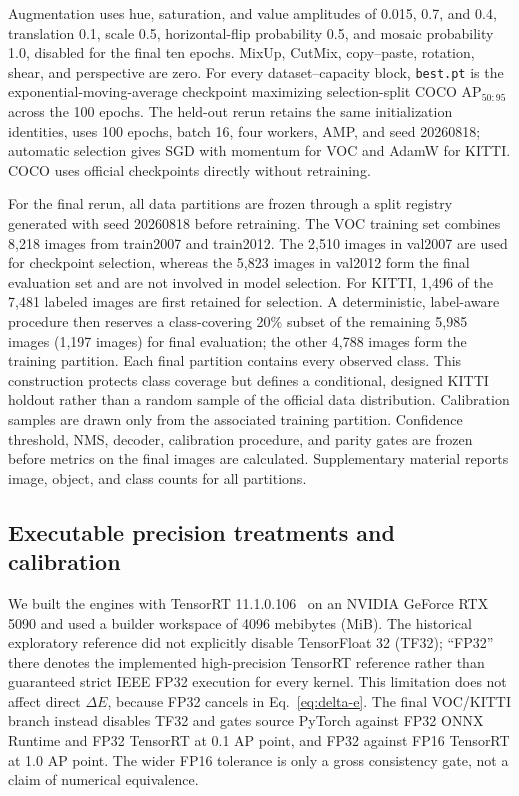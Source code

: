 \documentclass[a4paper,fleqn]{cas-dc}
\begin{document}
Augmentation uses hue, saturation, and value amplitudes of 0.015, 0.7, and 0.4, translation 0.1, scale 0.5, horizontal-flip probability 0.5, and mosaic probability 1.0, disabled for the final ten epochs. MixUp, CutMix, copy--paste, rotation, shear, and perspective are zero. For every dataset--capacity block, \texttt{best.pt} is the exponential-moving-average checkpoint maximizing selection-split COCO AP$_{50:95}$ across the 100 epochs. The held-out rerun retains the same initialization identities, uses 100 epochs, batch 16, four workers, AMP, and seed 20260818; automatic selection gives SGD with momentum for VOC and AdamW for KITTI. COCO uses official checkpoints directly without retraining.

For the final rerun, all data partitions are frozen through a split registry generated with seed 20260818 before retraining. The VOC training set combines 8,218 images from train2007 and train2012. The 2,510 images in val2007 are used for checkpoint selection, whereas the 5,823 images in val2012 form the final evaluation set and are not involved in model selection. For KITTI, 1,496 of the 7,481 labeled images are first retained for selection. A deterministic, label-aware procedure then reserves a class-covering 20\% subset of the remaining 5,985 images (1,197 images) for final evaluation; the other 4,788 images form the training partition. Each final partition contains every observed class. This construction protects class coverage but defines a conditional, designed KITTI holdout rather than a random sample of the official data distribution. Calibration samples are drawn only from the associated training partition. Confidence threshold, NMS, decoder, calibration procedure, and parity gates are frozen before metrics on the final images are calculated. Supplementary material reports image, object, and class counts for all partitions.

\subsection{Executable precision treatments and calibration}
\label{sec:precision-treatments}

We built the engines with TensorRT 11.1.0.106~\citep{nvidia2026tensorrt} on an NVIDIA GeForce RTX 5090 and used a builder workspace of 4096 mebibytes (MiB). The historical exploratory reference did not explicitly disable TensorFloat 32 (TF32); ``FP32'' there denotes the implemented high-precision TensorRT reference rather than guaranteed strict IEEE FP32 execution for every kernel. This limitation does not affect direct $\Delta E$, because FP32 cancels in Eq.~\eqref{eq:delta-e}. The final VOC/KITTI branch instead disables TF32 and gates source PyTorch against FP32 ONNX Runtime and FP32 TensorRT at 0.1 AP point, and FP32 against FP16 TensorRT at 1.0 AP point. The wider FP16 tolerance is only a gross consistency gate, not a claim of numerical equivalence.
\end{document}
